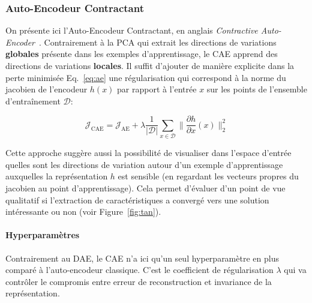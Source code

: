 

\subsubsection{Auto-Encodeur Contractant}

On présente ici l'Auto-Encodeur Contractant, en anglais \textit{Contractive
Auto-Encoder}~\citep{Rifai+al-2011}. Contrairement à la PCA qui extrait les
directions de variations \textbf{globales} présente dans les exemples
d'apprentissage, le CAE apprend des directions de variations \textbf{locales}.
Il suffit d'ajouter de manière explicite dans la perte minimisée
Eq.~\ref{eq:ae} une régularisation qui correspond à la norme du jacobien de
l'encodeur $h(x)$ par rapport à l'entrée $x$ sur les points de l'ensemble
d'entraînement $\mathcal{D}$:

\begin{equation}
\mathcal{J}_\textrm{CAE} = \mathcal{J}_\textrm{AE} + \lambda\frac{1}{\vert \mathcal{D}\vert}\sum_{x\in\mathcal{D}}\| \frac{\partial h}{\partial x}(x)\|_2^2
\label{eq:cae}
\end{equation}

Cette approche suggère aussi la possibilité de visualiser dans l'espace
d'entrée quelles sont les directions de variation autour d'un exemple
d'apprentissage auxquelles la représentation $h$ est sensible  (en regardant
les vecteurs propres du jacobien au point d'apprentissage). Cela permet
d'évaluer d'un point de vue qualitatif si l'extraction de caractéristiques a
convergé vers une solution intéressante ou non (voir Figure~\ref{fig:tan}).

\paragraph{Hyperparamètres} Contrairement au DAE, le CAE n'a ici qu'un seul
hyperparamètre en plus comparé à l'auto-encodeur classique. C'est le
coefficient de régularisation $\lambda$ qui va contrôler le compromis entre
erreur de reconstruction et invariance de la représentation.

